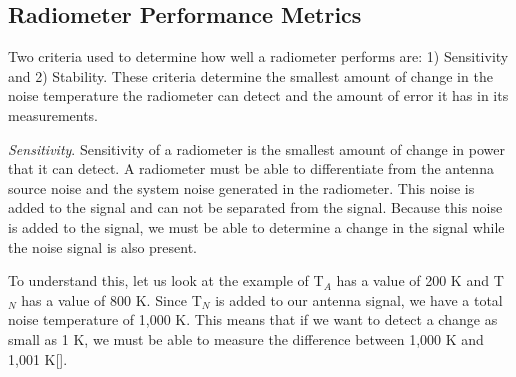 






\subsection{Radiometer Performance Metrics}
Two criteria used to determine how well a radiometer performs are: 1) Sensitivity and 2) Stability.  These criteria determine the smallest amount of change in the noise temperature the radiometer can detect and the amount of error it has in its measurements.

\emph{Sensitivity}.  Sensitivity of a radiometer is the smallest amount of change in power that it can detect.  A radiometer must be able to differentiate from the antenna source noise and the system noise generated in the radiometer.  This noise is added to the signal and can not be separated from the signal.  Because this noise is added to the signal, we must be able to determine a change in the signal while the noise signal is also present.  

To understand this, let us look at the example of T$_{A}$ has a value of 200 K and T$_{N}$ has a value of 800 K.  Since T$_{N}$ is added to our antenna signal, we have a total noise temperature of 1,000 K.  This means that if we want to detect a change as small as 1 K, we must be able to measure the difference between 1,000 K and 1,001 K[\cite{skou}].


